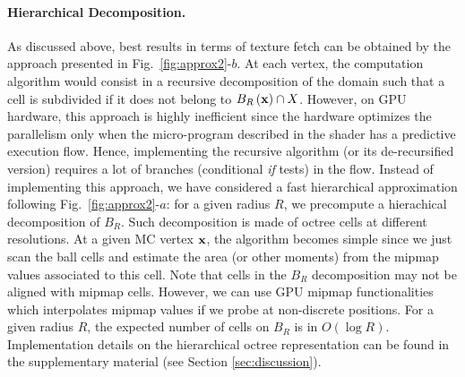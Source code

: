 \documentclass{llncs}
\begin{document}
\paragraph{Hierarchical Decomposition.}  As discussed above, best
results in terms of texture fetch can be obtained by the approach
presented in Fig.~\ref{fig:approx2}-$b$. At each vertex, the
computation algorithm would consist in a recursive decomposition of
the domain such that a cell is subdivided if it does not belong to
$B_{R}\left(\mathbf{x}\right)\cap X$. However, on GPU hardware, this approach is
highly inefficient since the hardware optimizes the parallelism only
when the micro-program described in the shader has a predictive
execution flow. Hence, implementing the recursive algorithm (or its
de-recursified version) requires a lot of branches (conditional
\emph{if} tests) in the flow. Instead of implementing this approach,
we have considered a fast hierarchical approximation following
Fig.~\ref{fig:approx2}-$a$: for a given radius $R$, we precompute a
hierachical decomposition of $B_R$. Such decomposition is made of
octree cells at different resolutions. At a given MC vertex $\mathbf{x}$, the
algorithm becomes simple since we just scan the ball cells and
estimate the area (or other moments) from the mipmap values associated
to this cell. Note that cells in the $B_R$ decomposition may not be
aligned with mipmap cells. However, we can use GPU mipmap
functionalities which interpolates mipmap values if we probe at
non-discrete positions. For a given radius $R$, the expected number of
cells on $B_R$ is in $O(\log{R})$. Implementation details on the
hierarchical octree representation can be found in the supplementary
material (see Section \ref{sec:discussion}).
\end{document}
